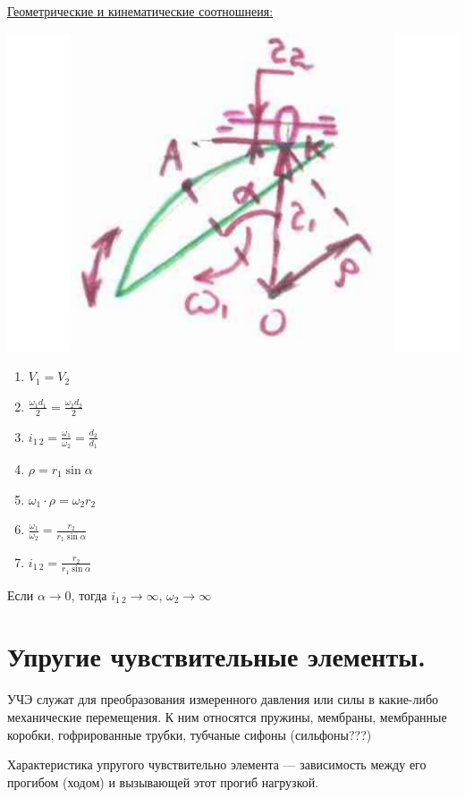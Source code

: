 \documentclass{article}
\begin{document}
\underline{Геометрические и кинематические соотношнеия:} 

\includegraphics[width = \textwidth]{18_2}
\begin{enumerate}
	\item $V_1 = V_2$
	\item $ \frac{ \omega_1 d_1}{2} = \frac{\omega_2 d_2}{2} $
	\item $i_{1\:2} = \frac{\omega_1}{\omega_2} = \frac{d_2}{d_1} $
	\item $\rho = r_1 \sin {\alpha}$
	\item $\omega_1 \cdot \rho = \omega_2 r_2$
	\item $ \frac{\omega_1}{\omega_2} = \frac{r_2}{r_1 \sin{ \alpha}} $
	\item $ i_{1\:2} = \frac{r_2}{r_1 \sin { \alpha}} $
\end{enumerate}

Если $ \alpha \to 0$, тогда $i_{1\:2} \to \infty$, $\omega_2 \to \infty$
\section {Упругие чувствительные элементы.}

УЧЭ служат для преобразования измеренного давления или силы в какие-либо механические перемещения. К ним относятся пружины,
мембраны, мембранные коробки, гофрированные трубки, тубчаные сифоны (сильфоны???)

Характеристика упругого чувствительно элемента --- зависимость между его прогибом (ходом) и вызывающей этот прогиб нагрузкой.
\end{document}
